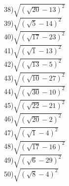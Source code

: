\documentclass[12pt,a4paper]{article}
\begin{document}
38)$\sqrt{(\sqrt{20}-13)^2}$\\
39)$\sqrt{(\sqrt{5}-14)^2}$\\
40)$\sqrt{(\sqrt{17}-23)^2}$\\
41)$\sqrt{(\sqrt{1}-13)^2}$\\
42)$\sqrt{(\sqrt{13}-5)^2}$\\
43)$\sqrt{(\sqrt{10}-27)^2}$\\
44)$\sqrt{(\sqrt{30}-10)^2}$\\
45)$\sqrt{(\sqrt{22}-21)^2}$\\
46)$\sqrt{(\sqrt{20}-2)^2}$\\
47)$\sqrt{(\sqrt{1}-4)^2}$\\
48)$\sqrt{(\sqrt{17}-16)^2}$\\
49)$\sqrt{(\sqrt{6}-29)^2}$\\
50)$\sqrt{(\sqrt{8}-4)^2}$\\
	
	
\end{document}
